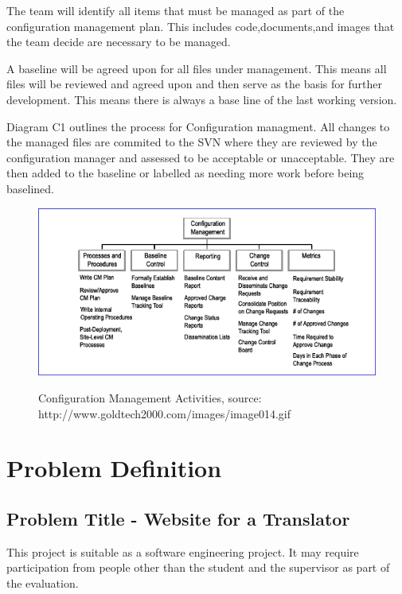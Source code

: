 \documentclass{l3proj}
\begin{document}
The team will identify all items that must be managed as part of the configuration management plan.
This includes code,documents,and images that the team decide are necessary to be managed.

A baseline will be agreed upon for all files under management. This means all files will be reviewed and
agreed upon and then serve as the basis for further development. This means there is always a base line
of the last working version.

Diagram C1 outlines the process for Configuration managment. 
All changes to the managed files are commited to the SVN where they are reviewed by the configuration
manager and assessed to be acceptable or unacceptable. They are then added to the baseline or labelled
as needing more work before being baselined.

\begin{figure}
\begin{center}
\label{fig:configman}
\includegraphics[scale=0.6]{config}
\caption{\small{Configuration Management Activities, source: http://www.goldtech2000.com/images/image014.gif}}
\end{center}
\end{figure}


\chapter{Problem Definition}
\label{chap:prob-spec}
\section{Problem Title - Website for a Translator}

This project is suitable as a software engineering project. It may require participation from people
other than the student and the supervisor as part of the evaluation.
\end{document}
